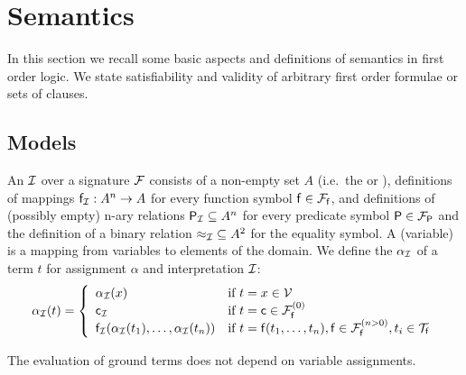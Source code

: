 











\section{Semantics}\label{sec:semantics}

In this section we recall some basic aspects and definitions of semantics in first order logic.
We state satisfiability and validity of arbitrary first order formulae or sets of clauses.

\subsection{Models}

\begin{definition}\label{def:interpretation}
	An  \( \mcI \) over a signature \( \mcF \) consists of a
	non-empty set \( A \) (i.e.~the  or ),
	definitions of mappings
	\( \mf_\mcI: A^n\rightarrow A \)
	for every function symbol \( \mf\in\mcFf \),
	and definitions of (possibly empty) n-ary relations
	 \( {\mP_\mcI}\subseteq A^n \) for every predicate symbol \( \mP\in\mcFP \)
	 and the definition of a binary relation \( {\mEQ_\mcI}\subseteq A^2 \) for the equality symbol.
	 A (variable)  is a mapping from variables to elements of the domain.
	 We define the  \( \alpha_\mcI \) of a term \( t \)
	 for assignment \( \alpha \) and interpretation \( \mcI \):
	 \begin{gather*}
	 \MDEFINE{\alpha_\mcI(t)}{ll}{
	 	\alpha_\mcI(x)
	 	&\text{if }t=x\in\mcV \\
	 	\mc_\mcI
	 	&\text{if }t=\mc\in\mcFfn[0]
	 	\\
	 	\mf_\mcI (\alpha_\mcI(t_1),\ldots,\alpha_\mcI(t_n))
	 	&\text{if }t=\mf(t_1,\ldots,t_n), \mf\in\mcFfn[n>0], t_i\in\mcTf
 }
	 \end{gather*}
\begin{remark}
	The evaluation of ground terms does not depend on variable assignments.
\end{remark}
\end{definition}

